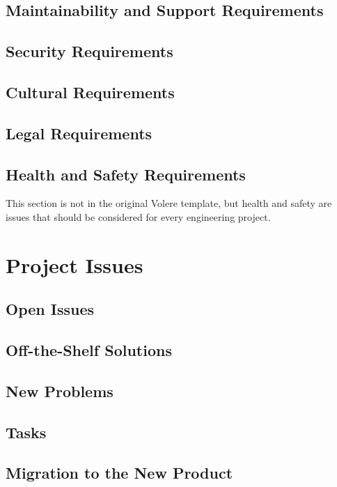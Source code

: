 \documentclass[12pt, titlepage]{article}
\begin{document}
\subsection{Maintainability and Support Requirements}

\subsection{Security Requirements}

\subsection{Cultural Requirements}

\subsection{Legal Requirements}

\subsection{Health and Safety Requirements}

This section is not in the original Volere template, but health and safety are
issues that should be considered for every engineering project.

\section{Project Issues}

\subsection{Open Issues}

\subsection{Off-the-Shelf Solutions}

\subsection{New Problems}

\subsection{Tasks}

\subsection{Migration to the New Product}
\end{document}
